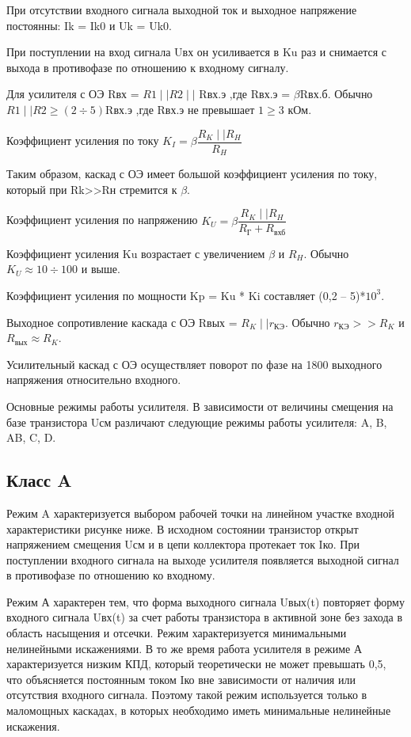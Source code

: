 \documentclass[unicode, 12pt, a4paper, oneside]{article}
\begin{document}
При отсутствии входного сигнала выходной ток и выходное напряжение постоянны: Ik = Ik0 и Uk = Uk0.

При поступлении на вход сигнала Uвх он усиливается в Ku раз и снимается с выхода в противофазе по отношению к входному сигналу.

Для усилителя с ОЭ Rвх = $R1 \mid\mid R2 \mid\mid$ Rвх.э ,где Rвх.э = $\beta$Rвх.б. Обычно $R1 \mid\mid R2 \geq (2 \div 5)$Rвх.э ,где Rвх.э не превышает $1 \geq 3$ кОм.

Коэффициент усиления по току $K_I = \beta \dfrac{R_K  \mid\mid R_H}{R_H}$

Таким образом, каскад с ОЭ имеет большой коэффициент усиления по току, который  при Rk>>Rн стремится к $\beta$.

Коэффициент усиления по напряжению $K_U = \beta \dfrac{R_K  \mid\mid R_H}{R_\text{Г} + R_\text{вхб}}$

Коэффициент усиления Ku возрастает с увеличением $\beta$ и $R_H$. Обычно $K_U \approx 10 \div 100$ и выше.

Коэффициент усиления по мощности Kp = Ku * Ki составляет (0,2 – 5)*$10^3$.

Выходное сопротивление каскада с ОЭ Rвых = $R_K \mid\mid r_\text{КЭ}$. Обычно $r_\text{КЭ} >> R_K$ и $R_\text{вых} \approx R_K$.

Усилительный каскад с ОЭ осуществляет поворот по фазе на 1800 выходного напряжения относительно входного.

Основные режимы работы усилителя. В зависимости от величины смещения на базе транзистора Uсм различают следующие режимы работы усилителя: A, B, AB, C, D.

\subsection*{Класс A}

Режим A характеризуется выбором рабочей точки на линейном участке входной характеристики рисунке ниже. В исходном состоянии транзистор открыт напряжением смещения Uсм и в цепи коллектора протекает ток Iко. При поступлении входного сигнала на выходе усилителя появляется выходной сигнал в противофазе по отношению ко входному.

Режим А характерен тем, что форма выходного сигнала Uвых(t) повторяет форму входного сигнала Uвх(t) за счет работы транзистора в активной зоне без захода в область насыщения и отсечки. Режим характеризуется минимальными нелинейными искажениями.
В то же время работа усилителя в режиме А характеризуется низким КПД, который теоретически не может превышать 0,5, что объясняется постоянным током Iко вне зависимости от наличия или отсутствия входного сигнала. Поэтому такой режим используется только в маломощных каскадах, в которых необходимо иметь минимальные нелинейные искажения.
\end{document}
